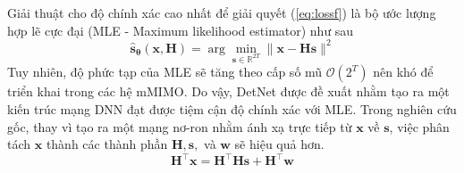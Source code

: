 Giải thuật cho độ chính xác cao nhất để giải quyết (\ref{eq:lossf}) là bộ ước lượng hợp lẽ cực đại (MLE - Maximum likelihood estimator) như sau
\begin{equation}
\label{eq:mle}
\hat{\mathbf{s}}_{\boldsymbol{\theta}}(\mathbf{x}, \mathbf{H})=\arg \min _{\mathbf{s} \in \mathbb{R}^{2T}}\|\mathbf{x}-\mathbf{H} \mathbf{s}\|^2
\end{equation}
Tuy nhiên, độ phức tạp của MLE sẽ tăng theo cấp số mũ $\mathcal{O}(2^T)$ nên khó để triển khai trong các hệ mMIMO. Do vậy, DetNet được đề xuất nhằm tạo ra một kiến trúc mạng DNN đạt được tiệm cận độ chính xác với MLE. Trong nghiên cứu gốc, thay vì tạo ra một mạng nơ-ron nhằm ánh xạ trực tiếp từ $\mathbf{x}$ về $\mathbf{s}$, việc phân tách $\mathbf{x}$ thành các thành phần $\mathbf{H}, \mathbf{s},$ và $\mathbf{w}$ sẽ hiệu quả hơn.
\begin{equation}
    \mathbf{H}^\top \mathbf{x}=\mathbf{H}^\top \mathbf{H s}+\mathbf{H}^\top \mathbf{w}
\end{equation}

